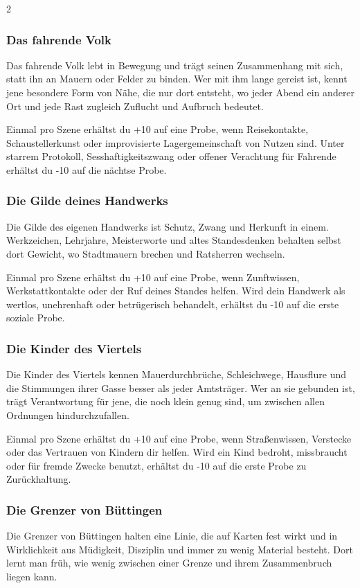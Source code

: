 {\begin{multicols*}{2}
        \subsubsection*{Das fahrende Volk}
        Das fahrende Volk lebt in Bewegung und trägt seinen Zusammenhang mit sich, statt ihn an Mauern oder Felder zu binden. Wer mit ihm lange gereist ist, kennt jene besondere Form von Nähe, die nur dort entsteht, wo jeder Abend ein anderer Ort und jede Rast zugleich Zuflucht und Aufbruch bedeutet.

        \bindungspielwertebox
        {Einmal pro Szene erhältst du +10 auf eine Probe, wenn Reisekontakte, Schaustellerkunst oder improvisierte Lagergemeinschaft von Nutzen sind.}
        {Unter starrem Protokoll, Sesshaftigkeitszwang oder offener Verachtung für Fahrende erhältst du -10 auf die nächtse Probe.}

        \subsubsection*{Die Gilde deines Handwerks}
        Die Gilde des eigenen Handwerks ist Schutz, Zwang und Herkunft in einem. Werkzeichen, Lehrjahre, Meisterworte und altes Standesdenken behalten selbst dort Gewicht, wo Stadtmauern brechen und Ratsherren wechseln.

        \bindungspielwertebox
        {Einmal pro Szene erhältst du +10 auf eine Probe, wenn Zunftwissen, Werkstattkontakte oder der Ruf deines Standes helfen.}
        {Wird dein Handwerk als wertlos, unehrenhaft oder betrügerisch behandelt, erhältst du -10 auf die erste soziale Probe.}

        \subsubsection*{Die Kinder des Viertels}
        Die Kinder des Viertels kennen Mauerdurchbrüche, Schleichwege, Hausflure und die Stimmungen ihrer Gasse besser als jeder Amtsträger. Wer an sie gebunden ist, trägt Verantwortung für jene, die noch klein genug sind, um zwischen allen Ordnungen hindurchzufallen.

        \bindungspielwertebox
        {Einmal pro Szene erhältst du +10 auf eine Probe, wenn Straßenwissen, Verstecke oder das Vertrauen von Kindern dir helfen.}
        {Wird ein Kind bedroht, missbraucht oder für fremde Zwecke benutzt, erhältst du -10 auf die erste Probe zu Zurückhaltung.}

        \subsubsection*{Die Grenzer von Büttingen}
        Die Grenzer von Büttingen halten eine Linie, die auf Karten fest wirkt und in Wirklichkeit aus Müdigkeit, Disziplin und immer zu wenig Material besteht. Dort lernt man früh, wie wenig zwischen einer Grenze und ihrem Zusammenbruch liegen kann.


\end{multicols*}}
